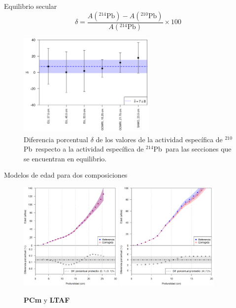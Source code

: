 \documentclass[9pt]{beamer}
\newcommand{\PbCero}{$^{210}$Pb}
\newcommand{\PbCuatro}{$^{214}$Pb}
\begin{document}
\begin{frame}{Equilibrio secular}
			\begin{equation}
			\delta = \dfrac{A(^{214}\text{Pb}) - A(^{210}\text{Pb}) }{A(^{214}\text{Pb}) } \times 100
			\end{equation}
			\begin{figure}
				\centering
				\includegraphics[width=0.6\textwidth]{Imagenes/Grafica_Delta_210Pb_214Pb-3.png}
				\caption{\justifying Diferencia porcentual $\delta$ de los valores de la actividad específica de \PbCero\, respecto a la actividad específica de \PbCuatro\, para las secciones que se encuentran en equilibrio.}
			\end{figure}
\end{frame}

\begin{frame}{Modelos de edad para dos composiciones}
	\begin{figure}
		\centering
		\includegraphics[width=0.45\textwidth]{Imagenes/PCm_1.png}
		\includegraphics[width=0.45\textwidth]{Imagenes/LTAF_1.png}
		\caption{ \textbf{PCm} y \textbf{LTAF}}
	\end{figure}
\end{frame}
\end{document}
